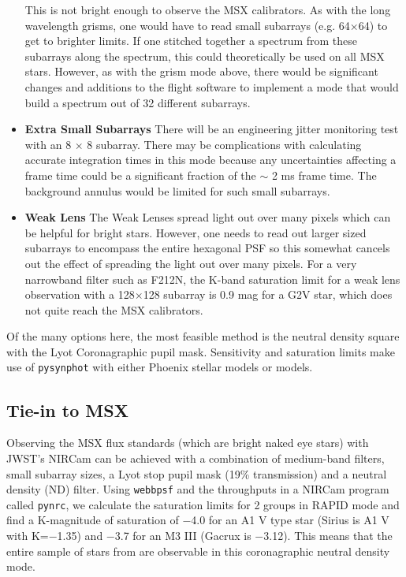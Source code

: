 \documentclass{aastex6}
\begin{document}
\begin{itemize}
This is not bright enough to observe the MSX calibrators.
As with the long wavelength grisms, one would have to read small subarrays (e.g. 64$\times$64) to get to brighter limits.
If one stitched together a spectrum from these subarrays along the spectrum, this could theoretically be used on all MSX stars.
However, as with the grism mode above, there would be significant changes and additions to the flight software to implement a mode that would build a spectrum out of 32 different subarrays.
\item \textbf{Extra Small Subarrays} There will be an engineering jitter monitoring test with an 8 $\times$ 8 subarray.
There may be complications with calculating accurate integration times in this mode because any uncertainties affecting a frame time could be a significant fraction of the $\sim$ 2 ms frame time.
The background annulus would be limited for such small subarrays.
\item \textbf{Weak Lens} The Weak Lenses spread light out over many pixels which can be helpful for bright stars. However, one needs to read out larger sized subarrays to encompass the entire hexagonal PSF so this somewhat cancels out the effect of spreading the light out over many pixels.
For a very narrowband filter such as F212N, the K-band saturation limit for a weak lens observation with a 128$\times$128 subarray is 0.9 mag for a G2V star, which does not quite reach the MSX calibrators.
\end{itemize}

Of the many options here, the most feasible method is the neutral density square with the Lyot Coronagraphic pupil mask.
Sensitivity and saturation limits make use of \texttt{pysynphot} \citep{lim2015pysynphot} with either Phoenix stellar models \citep{allard2012phoenix} or \citet{castelli2004models} models.

\subsection{Tie-in to MSX}

Observing the MSX flux standards (which are bright naked eye stars) with JWST's NIRCam can be achieved with a combination of medium-band filters, small subarray sizes, a Lyot stop pupil mask (19\% transmission) and a neutral density (ND) filter.
Using \texttt{webbpsf} and the throughputs in a NIRCam program called \texttt{pynrc}, we calculate the saturation limits for 2 groups in RAPID mode and find a K-magnitude of saturation of $-$4.0 for an A1 V type star (Sirius is A1 V with K=$-$1.35) and $-$3.7 for an M3 III (Gacrux is $-$3.12).
This means that the entire sample of stars from \citet{price2004msxCal} are observable in this coronagraphic neutral density mode.
\end{document}
